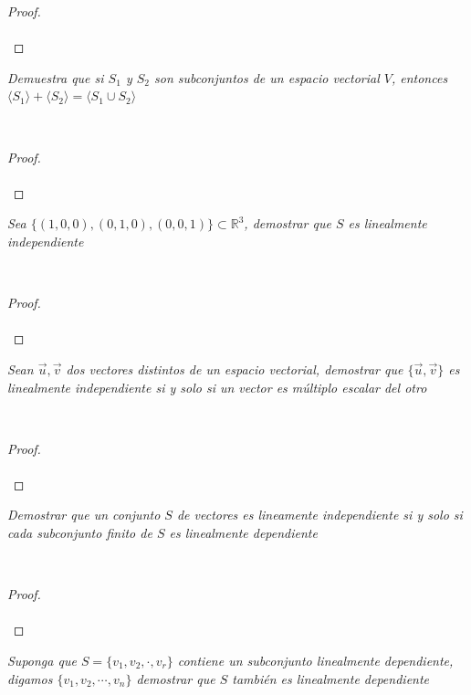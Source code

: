 \documentclass[11pt,letterpaper]{article}
\newcommand{\R}{\mathbb{R}}
\begin{document}
\begin{proof}\,\\
    \,\\
\end{proof}
\begin{tcolorbox}[
	title = \textcolor{black}{\textcolor{white}{Problema 7}},]
\textit{Demuestra que si $S_1$ y $S_2$ son subconjuntos de un espacio vectorial $V$, entonces
$\langle S_1 \rangle+ \langle  S_2\rangle=\langle S_1\cup S_2 \rangle  $
}
\end{tcolorbox}\,\\
\begin{proof}\,\\
    \,\\
\end{proof}
\begin{tcolorbox}[
	title = \textcolor{black}{\textcolor{white}{Problema 8}},]
\textit{Sea $\{(1,0,0),(0,1,0),(0,0,1)\}\subset \R^3$, demostrar que $S$ es linealmente independiente
}
\end{tcolorbox}\,\\
\begin{proof}\,\\
    \,\\
\end{proof}
\begin{tcolorbox}[
	title = \textcolor{black}{\textcolor{white}{Problema 9}},]
\textit{Sean $\vec{u},\vec{v}$ dos vectores distintos de un espacio vectorial, demostrar que $\{\vec{u},\vec{v}\}$
es linealmente independiente si y solo si un vector es m\'ultiplo escalar del otro
}
\end{tcolorbox}\,\\
\begin{proof}\,\\
    \,\\
\end{proof}
\begin{tcolorbox}[
	title = \textcolor{black}{\textcolor{white}{Problema 10}},]
\textit{Demostrar que un conjunto $S$ de vectores es lineamente independiente si y solo si cada subconjunto finito de $S$ es linealmente dependiente 
}
\end{tcolorbox}\,\\
\begin{proof}\,\\
    \,\\
\end{proof}
\begin{tcolorbox}[
	title = \textcolor{black}{\textcolor{white}{Problema 11}},]
\textit{Suponga que $S=\{v_1,v_2,\cdot,v_r\}$ contiene un subconjunto linealmente dependiente, digamos $\{v_1,v_2,\cdots,v_n\}$
demostrar que $S$ tambi\'en es linealmente dependiente
}
\end{tcolorbox}\,\\
\end{document}
